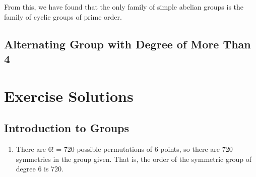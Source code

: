 From this, we have found that the only family of simple abelian groups is the family of cyclic groups of prime order.

\section{Alternating Group with Degree of More Than 4}

\appendix
\chapter{Exercise Solutions}

\section{Introduction to Groups}
\begin{enumerate}
    \item There are 6! = 720 possible permutations of 6 points, so there are 720 symmetries in the group given. That is, the order of the symmetric group of degree 6 is 720.
\end{enumerate}

